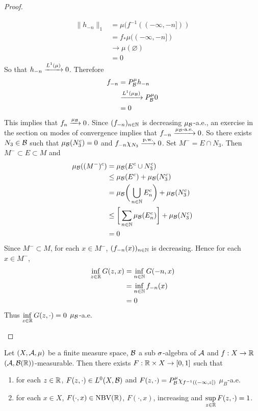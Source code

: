 \documentclass{book}
\begin{document}
\begin{proof}
\begin{enumerate}
		\begin{align*}
			\|h_{-n}\|_1
			& = \mu(f^{-1}((-\infty, -n])) \\
			& = f_*\mu((-\infty, -n]) \\
			& \rightarrow \mu(\varnothing) \\
			& = 0 
		\end{align*}
		So that $h_{-n} \xrightarrow{L^1(\mu)} 0$. Therefore  
		\begin{align*}
			f_{-n}
			& = P^{\mu}_{\mathcal{B}} h_{-n} \\
			& \xrightarrow{L^1(\mu_{\mathcal{B}})} P^{\mu}_{\mathcal{B}} 0 \\
			& = 0
		\end{align*}
		This implies that $f_n \xrightarrow{\mu_{\mathcal{B}}} 0$. Since $(f_{-n})_{n \in \mathbb{N}}$ is decreasing $\mu_{\mathcal{B}}$-a.e., an exercise in the section on modes of convergence implies that $f_{-n} \xrightarrow{\text{$\mu_{\mathcal{B}}$-a.e.}} 0$. So there exists $N_3 \in \mathcal{B}$ such that $\mu_{\mathcal{B}}(N_3^c) = 0$ and $f_{-n} \chi_{N_3} \xrightarrow{\text{p.w.}} 0$. Set $M^- = E \cap N_3$. Then $M^- \subset E \subset M$ and
		\begin{align*}
			\mu_{\mathcal{B}}((M^-)^c)
			& = \mu_{\mathcal{B}}(E^c \cup N_3^c) \\ 
			& \leq \mu_{\mathcal{B}}(E^c) + \mu_{\mathcal{B}}(N_3^c) \\
			& = \mu_{\mathcal{B}} \bigg( \bigcup_{n \in \mathbb{N}} E_n^c \bigg) + \mu_{\mathcal{B}}(N_3^c) \\
			& \leq \bigg[\sum_{n \in \mathbb{N}} \mu_{\mathcal{B}}(E_n^c) \bigg] + \mu_{\mathcal{B}}(N_3^c) \\
			& = 0
		\end{align*}
		Since $M^- \subset M$, for each $x \in M^-$, $(f_{-n}(x))_{n \in \mathbb{N}}$ is decreasing. Hence for each $x \in M^-$,
		\begin{align*}
			\inf\limits_{z \in \mathbb{R}} G(z, x) 
			& = \inf\limits_{n \in \mathbb{N}} G(-n, x) \\
			& = \inf\limits_{n \in \mathbb{N}} f_{-n}(x) \\
			& = 0
		\end{align*}
		Thus $\inf\limits_{z \in \mathbb{R}} G(z, \cdot) = 0$ $\mu_{\mathcal{B}}$-a.e.
		\end{enumerate}
	\end{proof}

	\begin{ex}
		Let $(X, \mathcal{A}, \mu)$ be a finite measure space, $\mathcal{B}$ a sub $\sigma$-algebra of $\mathcal{A}$ and $f: X \rightarrow \mathbb{R}$ $(\mathcal{A}, \mathcal{B}(\mathbb{R}))$-measurable. Then there exists $F: \mathbb{R} \times X \rightarrow [0,1]$ such that
		\begin{enumerate}
			\item for each $z \in \mathbb{R}$, $F(z, \cdot) \in L^0(X, \mathcal{B})$ and $F(z, \cdot) = P^{\mu}_{\mathcal{B}}\chi_{f^{-1}((-\infty, z])}$ $\mu_B$-a.e.
			\item for each $x \in X$, $F(\cdot, x) \in \text{NBV}(\mathbb{R})$, $F(\cdot, x)$, increasing and $\sup\limits_{z \in \mathbb{R}} F(z, \cdot) = 1$.
		\end{enumerate}
	\end{ex}
\end{document}
